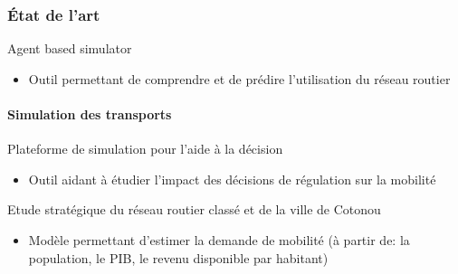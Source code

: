 %

\begin{frame}
    \frametitle{État de l'art}
    \begin{block}{Agent based simulator~\parencite{zargayouna2013agent}}
        \begin{itemize}
            \item {} Outil permettant de comprendre et de prédire l'utilisation du réseau routier
        \end{itemize}
    \end{block}
    \framesubtitle{Simulation des transports}
    \begin{block}{Plateforme de simulation pour l'aide à la décision~\parencite{nguyen2015plate}}
        \begin{itemize}
            \item {} Outil aidant à étudier l'impact des décisions de régulation sur la mobilité
        \end{itemize}
    \end{block}
    \begin{block}{Etude stratégique du réseau routier classé et de la ville de Cotonou~\parencite{louisberger2017etudes}}
        \begin{itemize}
            \item {} Modèle permettant d'estimer la demande de mobilité (à partir de: la population, le PIB, le revenu disponible par habitant)
        \end{itemize}
    \end{block}
\end{frame}

